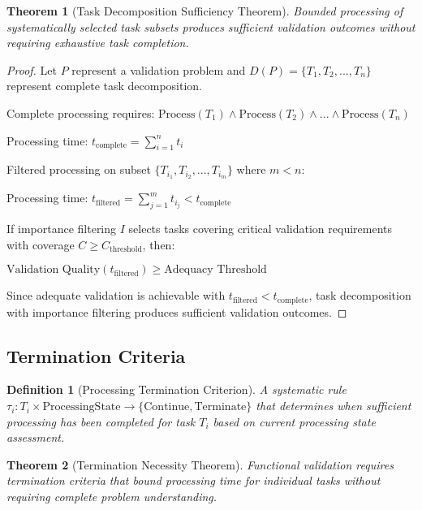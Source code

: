 \documentclass[12pt,a4paper]{article}
\newtheorem{theorem}{Theorem}
\newtheorem{definition}{Definition}
\begin{document}
\begin{theorem}[Task Decomposition Sufficiency Theorem]
Bounded processing of systematically selected task subsets produces sufficient validation outcomes without requiring exhaustive task completion.
\end{theorem}

\begin{proof}
Let $P$ represent a validation problem and $D(P) = \{T_1, T_2, ..., T_n\}$ represent complete task decomposition.

Complete processing requires: $\text{Process}(T_1) \land \text{Process}(T_2) \land ... \land \text{Process}(T_n)$

Processing time: $t_{\text{complete}} = \sum_{i=1}^{n} t_i$

Filtered processing on subset $\{T_{i_1}, T_{i_2}, ..., T_{i_m}\}$ where $m < n$:

Processing time: $t_{\text{filtered}} = \sum_{j=1}^{m} t_{i_j} < t_{\text{complete}}$

If importance filtering $I$ selects tasks covering critical validation requirements with coverage $C \geq C_{\text{threshold}}$, then:

$\text{Validation Quality}(t_{\text{filtered}}) \geq \text{Adequacy Threshold}$

Since adequate validation is achievable with $t_{\text{filtered}} < t_{\text{complete}}$, task decomposition with importance filtering produces sufficient validation outcomes.
\end{proof}

\subsection{Termination Criteria}

\begin{definition}[Processing Termination Criterion]
A systematic rule $\tau_i: T_i \times \text{ProcessingState} \to \{\text{Continue}, \text{Terminate}\}$ that determines when sufficient processing has been completed for task $T_i$ based on current processing state assessment.
\end{definition}

\begin{theorem}[Termination Necessity Theorem]
Functional validation requires termination criteria that bound processing time for individual tasks without requiring complete problem understanding.
\end{theorem}
\end{document}
